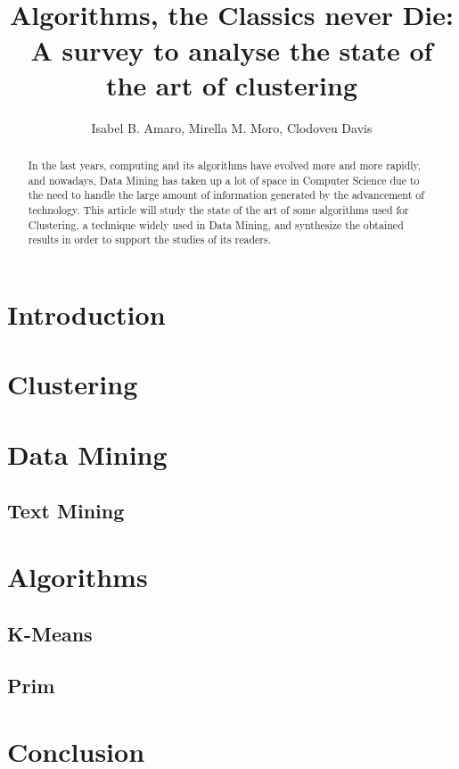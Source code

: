 \documentclass[12pt]{article}
\title{\\ Algorithms, the Classics never Die: A survey to analyse the state of the art of clustering}
\author{Isabel B. Amaro\inst{1}, Mirella M. Moro\inst{2}, Clodoveu Davis\inst{3}}
\begin{document}
 

\maketitle

\begin{abstract}
In the last years, computing and its algorithms have evolved more and more rapidly, and nowadays, Data Mining has taken up a lot of space in Computer Science due to the need to handle the large amount of information generated by the advancement of technology. This article will study the state of the art of some algorithms used for Clustering, a technique widely used in Data Mining, and synthesize the obtained results in order to support the studies of its readers.
\end{abstract}

\section{Introduction}

\section{Clustering}

\section{Data Mining}

\subsection{Text Mining}

\section{Algorithms}

\subsection{K-Means}

\subsection{Prim}

\section{Conclusion}
\end{document}
